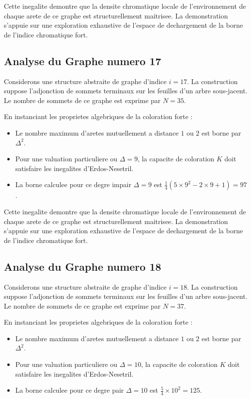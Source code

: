 \documentclass[11pt,a4paper]{article}
\begin{document}
Cette inegalite demontre que la densite chromatique locale de l'environnement de chaque arete de ce graphe est structurellement maitrisee. La demonstration s'appuie sur une exploration exhaustive de l'espace de dechargement de la borne de l'indice chromatique fort.

\subsection{Analyse du Graphe numero 17}
Considerons une structure abstraite de graphe d'indice $i = 17$. La construction suppose l'adjonction de sommets terminaux sur les feuilles d'un arbre sous-jacent. Le nombre de sommets de ce graphe est exprime par $N = 35$.

En instanciant les proprietes algebriques de la coloration forte :
\begin{itemize}
\item Le nombre maximum d'aretes mutuellement a distance $1$ ou $2$ est borne par $\Delta^2$.
\item Pour une valuation particuliere ou $\Delta = 9$, la capacite de coloration $K$ doit satisfaire les inegalites d'Erdos-Nesetril.
\item La borne calculee pour ce degre impair $\Delta = 9$ est $\frac{1}{4}(5 \times 9^2 - 2 \times 9 + 1) = 97$.
\end{itemize}

Cette inegalite demontre que la densite chromatique locale de l'environnement de chaque arete de ce graphe est structurellement maitrisee. La demonstration s'appuie sur une exploration exhaustive de l'espace de dechargement de la borne de l'indice chromatique fort.

\subsection{Analyse du Graphe numero 18}
Considerons une structure abstraite de graphe d'indice $i = 18$. La construction suppose l'adjonction de sommets terminaux sur les feuilles d'un arbre sous-jacent. Le nombre de sommets de ce graphe est exprime par $N = 37$.

En instanciant les proprietes algebriques de la coloration forte :
\begin{itemize}
\item Le nombre maximum d'aretes mutuellement a distance $1$ ou $2$ est borne par $\Delta^2$.
\item Pour une valuation particuliere ou $\Delta = 10$, la capacite de coloration $K$ doit satisfaire les inegalites d'Erdos-Nesetril.
\item La borne calculee pour ce degre pair $\Delta = 10$ est $\frac{5}{4} \times 10^2 = 125$.
\end{itemize}
\end{document}
